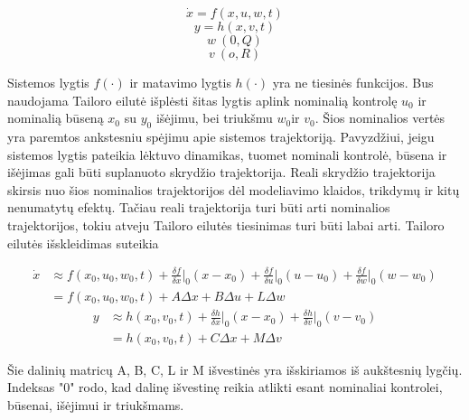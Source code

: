     \begin{equation}
        \dot{x} = f(x,u,w,t)
    \end{equation}
    \begin{equation}
        y = h(x,v,t)
    \end{equation}
    \begin{equation}
        w ~ (0,Q)
    \end{equation}
    \begin{equation}
        v ~ (o,R)
    \end{equation}

    Sistemos lygtis $f(\cdot)$ ir matavimo lygtis $h(\cdot)$ yra ne tiesinės funkcijos.
    Bus naudojama Tailoro eilutė išplėsti šitas lygtis aplink nominalią kontrolę $u_0$ ir nominalią būseną $x_0$ su $y_0$ išėjimu, bei triukšmu $w_0$ir $v_0$.
    Šios nominalios vertės yra paremtos ankstesniu spėjimu apie sistemos trajektoriją.
    Pavyzdžiui, jeigu sistemos lygtis pateikia lėktuvo dinamikas, tuomet nominali kontrolė, būsena ir išėjimas gali būti suplanuoto skrydžio trajektorija.
    Reali skrydžio trajektorija skirsis nuo šios nominalios trajektorijos dėl modeliavimo klaidos, trikdymų ir kitų nenumatytų efektų.
    Tačiau reali trajektorija turi būti arti nominalios trajektorijos, tokiu atveju Tailoro eilutės tiesinimas turi būti labai arti.
    Tailoro eilutės išskleidimas suteikia

    \begin{equation}
        \begin{aligned}
            \dot{x} &\approx f(x_0, u_0, w_0, t) + \frac{\delta f}{\delta x}\Bigr|_{0} (x-x_0) + \frac{\delta f}{\delta u}\Bigr|_{0} (u-u_0) + \frac{\delta f}{\delta w}\Bigr|_{0} (w-w_0) \\
            &= f(x_0, u_0, w_0, t) + A\Delta x + B \Delta u + L \Delta w
        \end{aligned}
    \end{equation}
    \begin{equation}
        \begin{aligned}
            y &\approx h(x_0, v_0, t) + \frac{\delta h}{\delta x}\Bigr|_{0}(x-x_0) + \frac{\delta h}{\delta v}\Bigr|_{0}(v-v_0) \\
            &= h(x_0, v_0, t) + C \Delta x + M \Delta v
        \end{aligned}
    \end{equation}

    Šie dalinių matricų A, B, C, L ir M išvestinės yra išskiriamos iš aukštesnių lygčių.
    Indeksas "0" rodo, kad dalinę išvestinę reikia atlikti esant nominaliai kontrolei, būsenai, išėjimui ir triukšmams.

